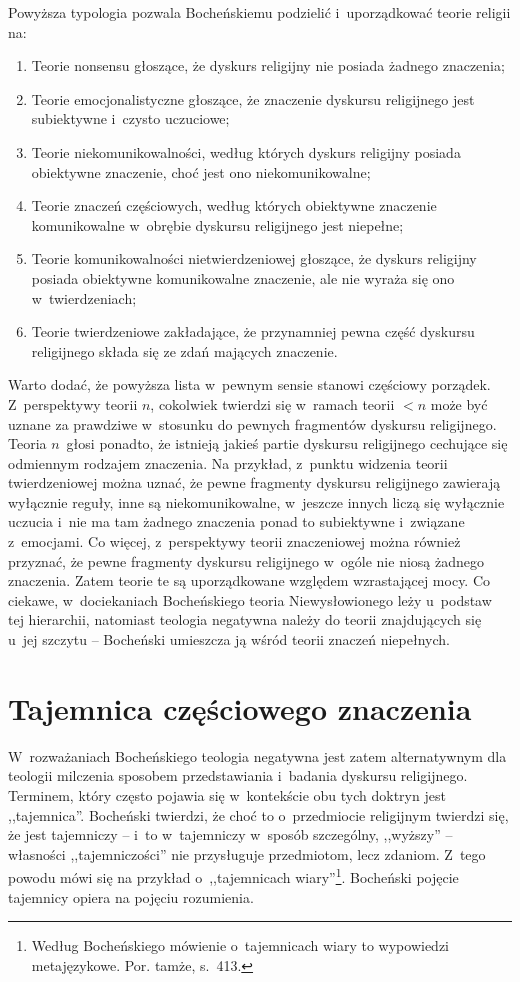 Powyższa typologia pozwala Bocheńskiemu podzielić i~uporządkować teorie religii na:

\begin{enumerate}
\item Teorie nonsensu głoszące, że dyskurs religijny nie posiada żadnego znaczenia;
\item Teorie emocjonalistyczne głoszące, że znaczenie dyskursu religijnego jest subiektywne i~czysto uczuciowe;
\item Teorie niekomunikowalności, według których dyskurs religijny posiada obiektywne znaczenie, choć jest ono niekomunikowalne;
\item Teorie znaczeń częściowych, według których obiektywne znaczenie komunikowalne w~obrębie dyskursu religijnego jest niepełne;
\item Teorie komunikowalności nietwierdzeniowej głoszące, że dyskurs religijny posiada obiektywne komunikowalne znaczenie, ale nie wyraża się ono w~twierdzeniach;
\item Teorie twierdzeniowe zakładające, że przynamniej pewna część dyskursu religijnego składa się ze zdań mających znaczenie.
\end{enumerate}
Warto dodać, że powyższa lista w~pewnym sensie stanowi częściowy porządek. Z~perspektywy teorii $n$, cokolwiek twierdzi się w~ramach teorii $<n$ może być uznane za prawdziwe w~stosunku do pewnych fragmentów dyskursu religijnego. Teoria $n$~głosi ponadto, że istnieją jakieś partie dyskursu religijnego cechujące się odmiennym rodzajem znaczenia. Na przykład, z~punktu widzenia teorii twierdzeniowej można uznać, że pewne fragmenty dyskursu religijnego zawierają wyłącznie reguły, inne są niekomunikowalne, w~jeszcze innych liczą się wyłącznie uczucia i~nie ma tam żadnego znaczenia ponad to subiektywne i~związane z~emocjami. Co więcej, z~perspektywy teorii znaczeniowej można również przyznać, że pewne fragmenty dyskursu religijnego w~ogóle nie niosą żadnego znaczenia. Zatem teorie te są uporządkowane względem wzrastającej mocy. Co ciekawe, w~dociekaniach Bocheńskiego teoria Niewysłowionego leży u~podstaw tej hierarchii, natomiast teologia negatywna należy do teorii znajdujących się u~jej szczytu -- Bocheński umieszcza ją wśród teorii znaczeń niepełnych.


\section{Tajemnica częściowego znaczenia}\label{sil-boch-tajem}

W~rozważaniach Bocheńskiego teologia negatywna jest zatem alternatywnym dla teologii milczenia sposobem przedstawiania i~badania dyskursu religijnego. Terminem, który często pojawia się w~kontekście obu tych doktryn jest ,,tajemnica''. Bocheński twierdzi, że choć to o~przedmiocie religijnym twierdzi się, że jest tajemniczy -- i~to w~tajemniczy w~sposób szczególny, ,,wyższy'' -- własności ,,tajemniczości'' nie przysługuje przedmiotom, lecz zdaniom. Z~tego powodu mówi się na przykład o~,,tajemnicach wiary''\footnote{Według Bocheńskiego mówienie o~tajemnicach wiary to wypowiedzi metajęzykowe. Por. tamże, s.~413.}. Bocheński pojęcie tajemnicy opiera na pojęciu rozumienia.

